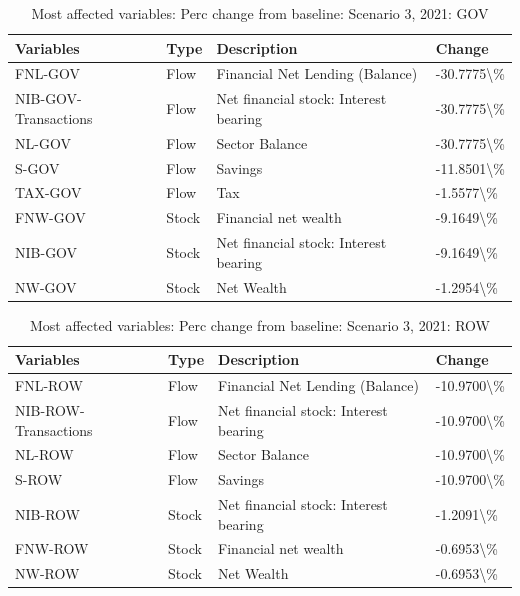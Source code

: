 \documentclass[
]{book}
\begin{document}
\begin{table}

\caption{\label{tab:most-affected-Scenario-3-perc-GOV}Most affected variables: Perc change from baseline: Scenario 3, 2021: GOV}
\centering
\fontsize{10}{12}\selectfont
\begin{tabular}[t]{l|l|l|l}
\hline
Variables & Type & Description & Change\\
\hline
FNL-GOV & Flow & Financial Net Lending (Balance) & -30.7775\textbackslash{}\%\\
\hline
NIB-GOV-Transactions & Flow & Net financial stock: Interest bearing & -30.7775\textbackslash{}\%\\
\hline
NL-GOV & Flow & Sector Balance & -30.7775\textbackslash{}\%\\
\hline
S-GOV & Flow & Savings & -11.8501\textbackslash{}\%\\
\hline
TAX-GOV & Flow & Tax & -1.5577\textbackslash{}\%\\
\hline
FNW-GOV & Stock & Financial net wealth & -9.1649\textbackslash{}\%\\
\hline
NIB-GOV & Stock & Net financial stock: Interest bearing & -9.1649\textbackslash{}\%\\
\hline
NW-GOV & Stock & Net Wealth & -1.2954\textbackslash{}\%\\
\hline
\end{tabular}
\end{table}

\begin{table}

\caption{\label{tab:most-affected-Scenario-3-perc-ROW}Most affected variables: Perc change from baseline: Scenario 3, 2021: ROW}
\centering
\fontsize{10}{12}\selectfont
\begin{tabular}[t]{l|l|l|l}
\hline
Variables & Type & Description & Change\\
\hline
FNL-ROW & Flow & Financial Net Lending (Balance) & -10.9700\textbackslash{}\%\\
\hline
NIB-ROW-Transactions & Flow & Net financial stock: Interest bearing & -10.9700\textbackslash{}\%\\
\hline
NL-ROW & Flow & Sector Balance & -10.9700\textbackslash{}\%\\
\hline
S-ROW & Flow & Savings & -10.9700\textbackslash{}\%\\
\hline
NIB-ROW & Stock & Net financial stock: Interest bearing & -1.2091\textbackslash{}\%\\
\hline
FNW-ROW & Stock & Financial net wealth & -0.6953\textbackslash{}\%\\
\hline
NW-ROW & Stock & Net Wealth & -0.6953\textbackslash{}\%\\
\hline
\end{tabular}
\end{table}
\end{document}
